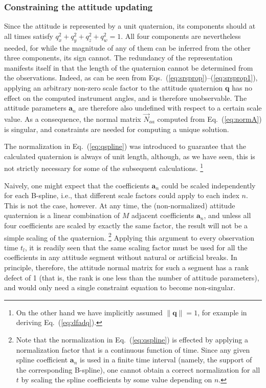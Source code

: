\documentclass[structabstract]{aa}
\newcommand{\quat}[1]{\mathbf{#1}}
\begin{document}
\subsubsection{Constraining the attitude updating}\label{sec:att-constr}

Since the attitude is represented by a unit quaternion, its components
should at all times satisfy $q_x^2+q_y^2+q_z^2+q_w^2=1$. All four components
are nevertheless needed, for while the magnitude of any of them can be inferred
from the other three components, its sign cannot. The redundancy of the
representation manifests itself in that the length of the quaternion cannot
be determined from the observations. Indeed, as can be seen from
Eqs.~(\ref{eq:srsprop})--(\ref{eq:srsprop1}), applying an arbitrary non-zero
scale factor to the attitude quaternion $\quat{q}$ has no effect on the computed
instrument angles, and is therefore unobservable. The attitude parameters
$\quat{a}_n$ are therefore also undefined with respect to a certain scale
value. As a consequence, the normal matrix $\vec{N}_{aa}$ computed from
Eq.~(\ref{eq:normA}) is singular, and constraints are needed for computing
a unique solution.

The normalization in Eq.~(\ref{eq:qspline}) was introduced to guarantee that
the calculated quaternion is always of unit length, although, as we have
seen, this is not strictly necessary for some of the subsequent calculations.%
\footnote{On the other hand we have implicitly assumed $\|\quat{q}\|=1$, for
example in deriving Eq.~(\ref{eq:dfadq}).}

Naively, one might expect that the coefficients $\quat{a}_n$ could be
scaled independently for each B-spline, i.e., that different scale factors
could apply to each index $n$. This is not the case, however. At any time,
the (non-normalized) attitude quaternion is a linear combination of $M$
adjacent coefficients $\quat{a}_n$, and unless all four coefficients
are scaled by exactly the same factor, the result will not be a simple
scaling of the quaternion.%
\footnote{Note that the normalization in Eq.~(\ref{eq:qspline}) is effected
by applying a normalization factor that is a continuous function of time.
Since any given spline coefficient $\quat{a}_n$ is used in a finite time 
interval (namely, the support of the corresponding B-spline), one cannot 
obtain a correct normalization for all $t$ by scaling the spline coefficients
by some value depending on $n$.}
Applying this argument to every observation time $t_l$, it is readily
seen that the same scaling factor must be used for all the coefficients
in any attitude segment without natural or artificial breaks. In principle,
therefore, the attitude normal matrix for such a segment has a rank defect
of 1 (that is, the rank is one less than the number of attitude parameters),
and would only need a single constraint equation to become non-singular.
\end{document}
